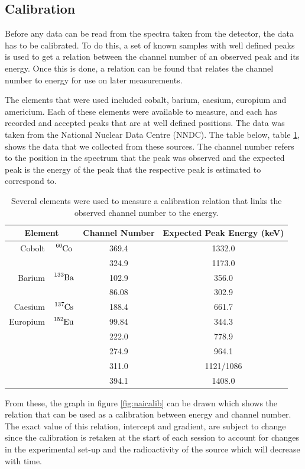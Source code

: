 
\subsection{Calibration} %
\label{sub:calibration}
Before any data can be read from the spectra taken from the detector, the data has to be calibrated. To do this, a set of known samples with well defined peaks is used to get a relation between the channel number of an observed peak and its energy. Once this is done, a relation can be found that relates the channel number to energy for use on later measurements.

The elements that were used included cobalt, barium, caesium, europium and americium. Each of these elements were available to measure, and each has recorded and accepted peaks that are at well defined positions. The data was taken from the National Nuclear Data Centre (NNDC). The table below, table \ref{tab:calibdata}, shows the data that we collected from these sources. The channel number refers to the position in the spectrum that the peak was observed and the expected peak is the energy of the peak that the respective peak is estimated to correspond to.

\begin{table}[ht]
	\centering
	\begin{tabular}{r c|c|c}
		\multicolumn{2}{c|}{Element} & Channel Number & Expected Peak Energy (keV) \\
		\hline\hline
		Cobolt 		& $\ce{^{60}Co}$  & 369.4	& 1332.0 \\
					&				  & 324.9	& 1173.0	\\
		\hline
		Barium		& $\ce{^{133}Ba}$ & 102.9	& 356.0	\\
					&				  & 86.08	& 302.9		\\
		\hline
		Caesium		& $\ce{^{137}Cs}$ & 188.4	& 661.7 \\
		\hline
		Europium	& $\ce{^{152}Eu}$ & 99.84	& 344.3 \\
					&				  & 222.0	& 778.9		\\
					&				  & 274.9	& 964.1		\\
					&				  & 311.0	& 1121/1086	\\
					&				  & 394.1	& 1408.0	
	\end{tabular}
	\caption{Several elements were used to measure a calibration relation that links the observed channel number to the energy.\label{tab:calibdata}}
\end{table}
From these, the graph in figure \ref{fig:naicalib} can be drawn which shows the relation that can be used as a calibration between energy and channel number. The exact value of this relation, intercept and gradient, are subject to change since the calibration is retaken at the start of each session to account for changes in the experimental set-up and the radioactivity of the source which will decrease with time.

